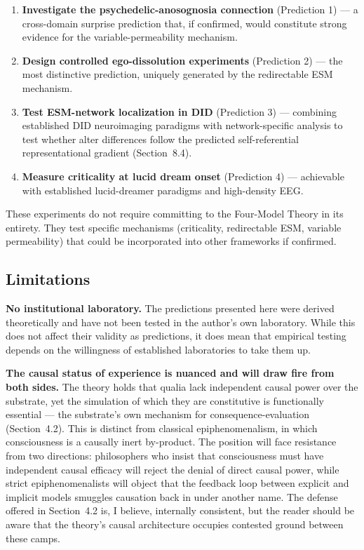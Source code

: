 \documentclass[12pt]{article}
\begin{document}
\begin{enumerate}
\item \textbf{Investigate the psychedelic-anosognosia connection} (Prediction 1) --- a cross-domain surprise prediction that, if confirmed, would constitute strong evidence for the variable-permeability mechanism.
\item \textbf{Design controlled ego-dissolution experiments} (Prediction 2) --- the most distinctive prediction, uniquely generated by the redirectable ESM mechanism.
\item \textbf{Test ESM-network localization in DID} (Prediction 3) --- combining established DID neuroimaging paradigms with network-specific analysis to test whether alter differences follow the predicted self-referential representational gradient (Section~8.4).
\item \textbf{Measure criticality at lucid dream onset} (Prediction 4) --- achievable with established lucid-dreamer paradigms and high-density EEG.
\end{enumerate}

These experiments do not require committing to the Four-Model Theory in its entirety. They test specific mechanisms (criticality, redirectable ESM, variable permeability) that could be incorporated into other frameworks if confirmed.


\subsection{Limitations}


\textbf{No institutional laboratory.} The predictions presented here were derived theoretically and have not been tested in the author's own laboratory. While this does not affect their validity as predictions, it does mean that empirical testing depends on the willingness of established laboratories to take them up.

\textbf{The causal status of experience is nuanced and will draw fire from both sides.} The theory holds that qualia lack independent causal power over the substrate, yet the simulation of which they are constitutive is functionally essential --- the substrate's own mechanism for consequence-evaluation (Section~4.2). This is distinct from classical epiphenomenalism, in which consciousness is a causally inert by-product. The position will face resistance from two directions: philosophers who insist that consciousness must have independent causal efficacy will reject the denial of direct causal power, while strict epiphenomenalists will object that the feedback loop between explicit and implicit models smuggles causation back in under another name. The defense offered in Section~4.2 is, I believe, internally consistent, but the reader should be aware that the theory's causal architecture occupies contested ground between these camps.
\end{document}
